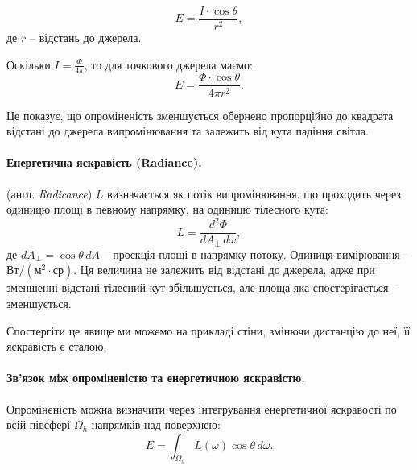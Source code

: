 \[
E = \frac{I \cdot \cos{\theta}}{r^2},
\] де $r$ -- відстань до джерела.

Оскільки $I = \frac{\Phi}{4\pi}$, то для точкового джерела маємо:
\[
E = \frac{\Phi \cdot \cos{\theta}}{4\pi r^2}.
\]

Це показує, що опроміненість зменшується обернено пропорційно до квад\-ра\-та відстані до джерела випромінювання та залежить від кута падіння світла.

\paragraph{Енергетична яскравість (Radiance).}
 \linebreak (англ. \textit{Radicance}) $L$ визначається як потік випромінювання, що проходить через одиницю площі в певному напрямку, на одиницю тілесного кута:
\[
L = \frac{d^2\Phi}{dA_{\perp} \, d\omega},
\]
де $dA_{\perp} = \cos{\theta} \, dA$ -- проєкція площі в напрямку потоку. Одиниця вимірювання -- $\text{Вт}/(\text{м}^2\cdot\text{ср})$.
Ця величина не залежить від відстані до джерела, адже при зменшенні відстані тілесний кут збільшується, але площа яка спостерігається -- зменшується.
\par
Спостергіти це явище ми можемо на прикладі стіни, змінючи дистанцію до неї, її яскравість 
є сталою.

\paragraph{Зв'язок між опроміненістю та енергетичною яскравістю.}
Опроміненість можна визначити через інтегрування енергетичної яскравості по всій півсфері $\Omega_h$ напрямків над поверхнею:
\begin{equation}
 \label{eq:RadianceToIrradiance}
    E = \int_{\Omega_h} L(\omega) \cos{\theta} \, d\omega.
\end{equation}


